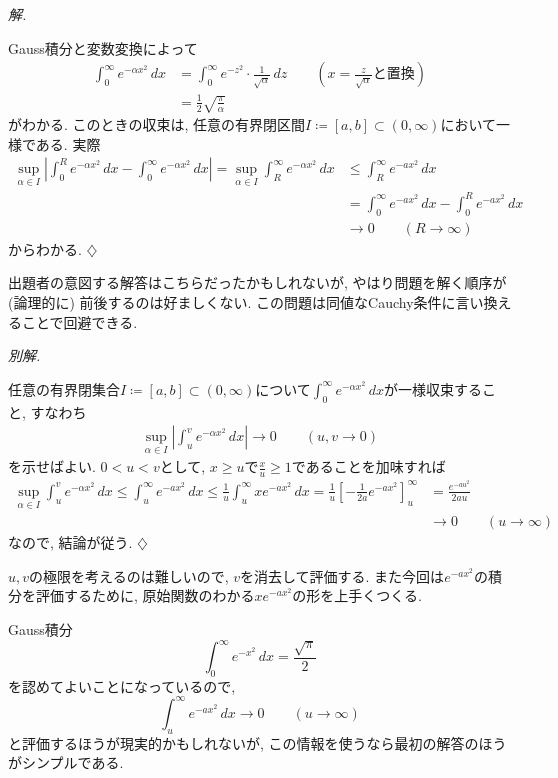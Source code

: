 \documentclass[titlepage]{jsarticle}
\numberwithin{equation}{section}
\newenvironment{kaitou}[1][解]{%
\begin{proofbox}%
\textit{#1. }\ignorespaces
}{%
\hfill$\diamondsuit$%
\end{proofbox}%
}
\begin{document}
\begin{kaitou}
Gauss積分と変数変換によって
\begin{align*}
\int_0^\infty e^{-\alpha x^2}\,dx &=\int_0^\infty e^{-z^2}\cdot\frac{1}{\sqrt{\alpha}}\,dz\qquad\left(x = \frac{z}{\sqrt{\alpha}}\text{と置換}\right)\\
&=\boxed{\frac{1}{2}\sqrt{\frac{\pi}{\alpha}}}
\end{align*}
がわかる. このときの収束は, 任意の有界閉区間$I \coloneq [a,b] \subset (0, \infty)$において一様である. 実際
\begin{align*}
\sup_{\alpha \in I} \left|\int_0^R e^{-\alpha x^2}\,dx - \int_0^\infty e^{-\alpha x^2}\,dx\right| = \sup_{\alpha \in I} \int_R^\infty e^{-\alpha x^2}\,dx &\le \int_R^\infty e^{-ax^2}\,dx\\ 
&= \int_0^\infty e^{-ax^2}\,dx - \int_0^R e^{-ax^2}\,dx\\
& \to 0\qquad(R \to \infty)
\end{align*}
からわかる.
\end{kaitou}
出題者の意図する解答はこちらだったかもしれないが, やはり問題を解く順序が (論理的に) 前後するのは好ましくない. この問題は同値なCauchy条件に言い換えることで回避できる. 
\begin{kaitou}[別解]
任意の有界閉集合$I \coloneq [a, b] \subset (0, \infty)$について$\int_0^\infty e^{-\alpha x^2}\, dx$が一様収束すること, すなわち
\begin{align}
\sup_{\alpha \in I}\left|\int_{u}^{v}e^{-\alpha x^2}\,dx\right| \to 0 \qquad(u, v \to 0) \label{eq:tmu2026-4d}
\end{align}
を示せばよい. $0 < u < v$として, $x \ge u$で$\frac{x}{u} \ge 1$であることを加味すれば
\begin{align*}
\sup_{\alpha \in I} \int_u^v e^{-\alpha x^2}\,dx \le \int_u^\infty e^{-ax^2}\, dx \le \frac{1}{u}\int_
u^\infty xe^{-a x^2}\, dx = \frac{1}{u}\left[-\frac{1}{2a}e^{-ax^2}\right]_u^\infty &= \frac{e^{-a u^2}}{2au}\\
 &\to 0 \qquad(u \to \infty)
\end{align*}
なので, 結論が従う.
\end{kaitou}
\begin{marker}
$u, v$の極限を考えるのは難しいので, $v$を消去して評価する. また今回は$e^{-a x^2}$の積分を評価するために, 原始関数のわかる$xe^{-a x^2}$の形を上手くつくる.
\end{marker}
\begin{marker}
Gauss積分
\[
\int_0^\infty e^{-x^2}\, dx = \frac{\sqrt{\pi}}{2} 
\]
を認めてよいことになっているので,
\[
\int_u^\infty e^{-a x^2}\, dx \to 0 \qquad(u \to \infty)
\]
と評価するほうが現実的かもしれないが, この情報を使うなら最初の解答のほうがシンプルである.
\end{marker}
\end{document}

